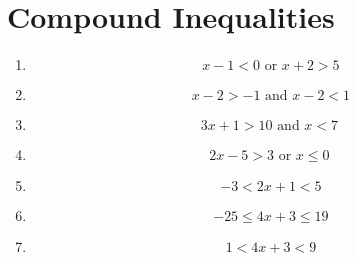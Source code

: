\documentclass[letterpaper, landscape]{exam}
\begin{document}
  \section{Compound Inequalities}
  
  \begin{enumerate}
    \item 
      \[
        x - 1 < 0 \text{ or } x + 2 > 5 
      \]

    \item
      \[
        x - 2 > -1 \text{ and } x - 2 < 1 
      \]

    \item 
      \[
        3x + 1 > 10 \text{ and } x < 7 \
      \]

    \item 
      \[
        2x - 5 > 3 \text{ or } x \leq 0 \
      \]

    \item
      \[
        -3 < 2x + 1 < 5 
      \]

    \item
      \[
        -25 \leq 4x + 3 \leq 19
      \]

    \item
      \[
        1 < 4x + 3 < 9
      \]

  \end{enumerate}
\end{document}
